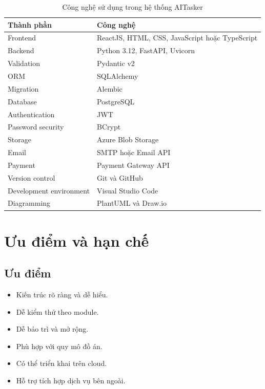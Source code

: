\begin{table}[H]
    \centering
    \caption{Công nghệ sử dụng trong hệ thống AITasker}
    \label{tab:technology-stack}
    \begin{tabular}{|p{4.4cm}|p{9.0cm}|}
        \hline
        \textbf{Thành phần} & \textbf{Công nghệ} \\ \hline
        Frontend & ReactJS, HTML, CSS, JavaScript hoặc TypeScript \\ \hline
        Backend & Python 3.12, FastAPI, Uvicorn \\ \hline
        Validation & Pydantic v2 \\ \hline
        ORM & SQLAlchemy \\ \hline
        Migration & Alembic \\ \hline
        Database & PostgreSQL \\ \hline
        Authentication & JWT \\ \hline
        Password security & BCrypt \\ \hline
        Storage & Azure Blob Storage \\ \hline
        Email & SMTP hoặc Email API \\ \hline
        Payment & Payment Gateway API \\ \hline
        Version control & Git và GitHub \\ \hline
        Development environment & Visual Studio Code \\ \hline
        Diagramming & PlantUML và Draw.io \\ \hline
    \end{tabular}
\end{table}

\section{Ưu điểm và hạn chế}
\label{sec:architecture-evaluation}

\subsection{Ưu điểm}

\begin{itemize}
    \item Kiến trúc rõ ràng và dễ hiểu.
    \item Dễ kiểm thử theo module.
    \item Dễ bảo trì và mở rộng.
    \item Phù hợp với quy mô đồ án.
    \item Có thể triển khai trên cloud.
    \item Hỗ trợ tích hợp dịch vụ bên ngoài.
\end{itemize}

